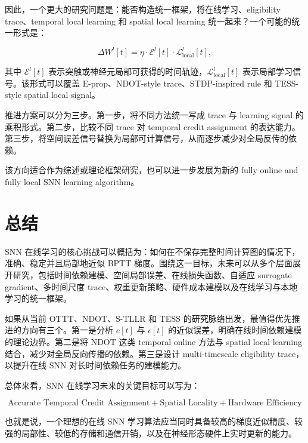 \documentclass[11pt]{ctexart}
\begin{document}
因此，一个更大的研究问题是：能否构造统一框架，将在线学习、eligibility trace、temporal local learning 和 spatial local learning 统一起来？一个可能的统一形式是：

\begin{equation}
\Delta W^l[t]
=
\eta \cdot
\mathcal{E}^l[t]
\cdot
\mathcal{L}^l_{\mathrm{local}}[t],
\end{equation}

其中 $\mathcal{E}^l[t]$ 表示突触或神经元局部可获得的时间轨迹，$\mathcal{L}^l_{\mathrm{local}}[t]$ 表示局部学习信号。该形式可以覆盖 E-prop、NDOT-style trace、STDP-inspired rule 和 TESS-style spatial local signal。

推进方案可以分为三步。第一步，将不同方法统一写成 trace 与 learning signal 的乘积形式。第二步，比较不同 trace 对 temporal credit assignment 的表达能力。第三步，将空间误差信号替换为局部可计算信号，从而逐步减少对全局反传的依赖。

该方向适合作为综述或理论框架研究，也可以进一步发展为新的 fully online and fully local SNN learning algorithm。

\section{总结}

SNN 在线学习的核心挑战可以概括为：如何在不保存完整时间计算图的情况下，准确、稳定并且局部地近似 BPTT 梯度。围绕这一目标，未来可以从多个层面展开研究，包括时间依赖建模、空间局部误差、在线损失函数、自适应 surrogate gradient、多时间尺度 trace、权重更新策略、硬件成本建模以及在线学习与本地学习的统一框架。

如果从当前 OTTT、NDOT、S-TLLR 和 TESS 的研究脉络出发，最值得优先推进的方向有三个。第一是分析 $e[t]$ 与 $\epsilon[t]$ 的近似误差，明确在线时间依赖建模的理论边界。第二是将 NDOT 这类 temporal online 方法与 spatial local learning 结合，减少对全局反向传播的依赖。第三是设计 multi-timescale eligibility trace，以提升在线 SNN 对长时间依赖任务的建模能力。

总体来看，SNN 在线学习未来的关键目标可以写为：

\begin{equation}
\boxed{
\text{Accurate Temporal Credit Assignment}
+
\text{Spatial Locality}
+
\text{Hardware Efficiency}
}
\end{equation}

也就是说，一个理想的在线 SNN 学习算法应当同时具备较高的梯度近似精度、较强的局部性、较低的存储和通信开销，以及在神经形态硬件上实时更新的能力。
\end{document}
